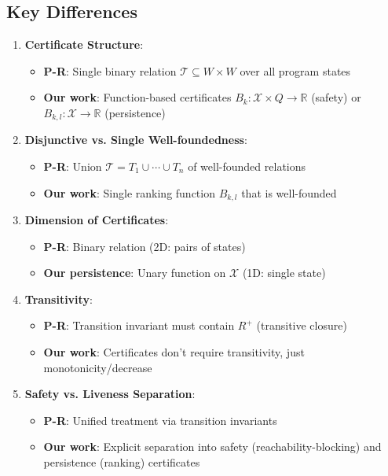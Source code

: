 \documentclass{article}
\begin{document}
\subsection{Key Differences}

\begin{enumerate}
    \item \textbf{Certificate Structure}:
    \begin{itemize}
        \item \textbf{P-R}: Single binary relation $\mathcal{T} \subseteq W \times W$ over all program states
        \item \textbf{Our work}: Function-based certificates $B_k: \mathcal{X} \times Q \to \mathbb{R}$ (safety) or $B_{k,l}: \mathcal{X} \to \mathbb{R}$ (persistence)
    \end{itemize}

    \item \textbf{Disjunctive vs. Single Well-foundedness}:
    \begin{itemize}
        \item \textbf{P-R}: Union $\mathcal{T} = T_1 \cup \cdots \cup T_n$ of well-founded relations
        \item \textbf{Our work}: Single ranking function $B_{k,l}$ that is well-founded
    \end{itemize}

    \item \textbf{Dimension of Certificates}:
    \begin{itemize}
        \item \textbf{P-R}: Binary relation (2D: pairs of states)
        \item \textbf{Our persistence}: Unary function on $\mathcal{X}$ (1D: single state)
    \end{itemize}

    \item \textbf{Transitivity}:
    \begin{itemize}
        \item \textbf{P-R}: Transition invariant must contain $R^+$ (transitive closure)
        \item \textbf{Our work}: Certificates don't require transitivity, just monotonicity/decrease
    \end{itemize}

    \item \textbf{Safety vs. Liveness Separation}:
    \begin{itemize}
        \item \textbf{P-R}: Unified treatment via transition invariants
        \item \textbf{Our work}: Explicit separation into safety (reachability-blocking) and persistence (ranking) certificates
    \end{itemize}
\end{enumerate}
\end{document}
